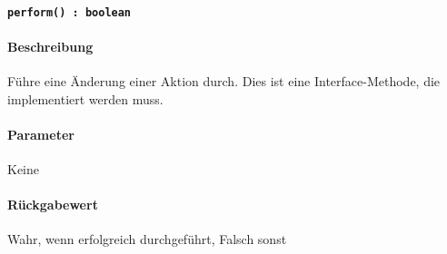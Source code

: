 \paragraph{\texttt{perform() : boolean}}%
\paragraph*{Beschreibung}
Führe eine Änderung einer Aktion durch.
Dies ist eine Interface-Methode, die implementiert werden muss.
\paragraph*{Parameter}
Keine
\paragraph*{Rückgabewert}
Wahr, wenn erfolgreich durchgeführt, Falsch sonst
